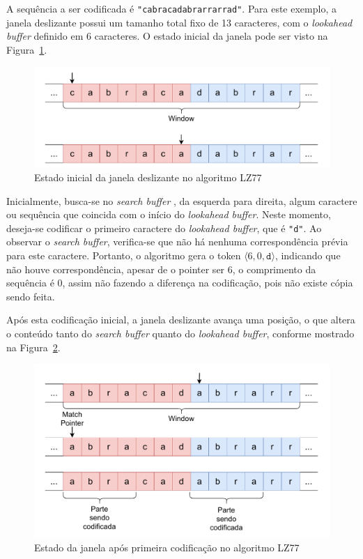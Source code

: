A sequência a ser codificada é \texttt{"cabracadabrarrarrad"}. Para este exemplo, a janela deslizante possui
um tamanho total fixo de 13 caracteres, com o \textit{lookahead buffer}
definido em 6 caracteres. O estado inicial da janela pode ser visto na
Figura~\ref{fig:Estado_0_LZ77}.

\begin{figure}[htp]
  \centering
  \caption{Estado inicial da janela deslizante no algoritmo LZ77}
  \label{fig:Estado_0_LZ77}
  \includegraphics[width=15cm]{figuras/DiagramasTCC-LZ77-Estado-0.pdf}
\end{figure}

Inicialmente, busca-se no \textit{search buffer} , da esquerda para direita, algum caractere ou sequência
que coincida com o início do \textit{lookahead buffer}. Neste momento,
deseja-se codificar o primeiro caractere do \textit{lookahead buffer}, que é
\texttt{"d"}. Ao observar o \textit{search buffer}, verifica-se que não há
nenhuma correspondência prévia para este caractere. Portanto, o algoritmo gera
o token $\langle 6, 0, \texttt{d} \rangle$, indicando que não houve
correspondência, apesar de o pointer ser 6, o comprimento da sequência
 é 0, assim não fazendo a diferença na codificação, pois não existe cópia sendo feita.

Após esta codificação inicial, a janela deslizante avança uma posição, o que
altera o conteúdo tanto do \textit{search buffer} quanto do \textit{lookahead
  buffer}, conforme mostrado na Figura~\ref{fig:Estado_1_LZ77}.

\begin{figure}[htp]
  \centering
  \caption{Estado da janela após primeira codificação no algoritmo LZ77}
  \label{fig:Estado_1_LZ77}
  \includegraphics[width=15cm]{figuras/DiagramasTCC-LZ77-Estado-1.pdf}
\end{figure}

